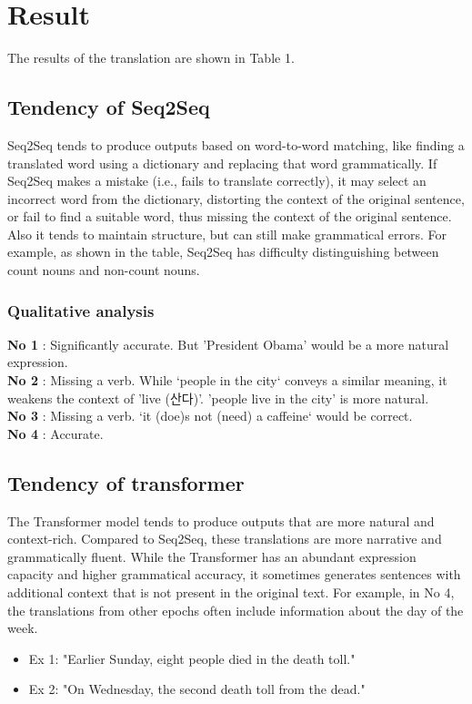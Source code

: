 \documentclass{article}
\begin{document}
\section{Result}
The results of the translation are shown in Table 1. 
\subsection{Tendency of Seq2Seq}
Seq2Seq tends to produce outputs based on word-to-word matching, like finding a translated word using a dictionary and replacing that word grammatically. If Seq2Seq makes a mistake (i.e., fails to translate correctly), it may select an incorrect word from the dictionary, distorting the context of the original sentence, or fail to find a suitable word, thus missing the context of the original sentence. Also it tends to maintain structure, but can still make grammatical errors. For example, as shown in the table, Seq2Seq has difficulty distinguishing between count nouns and non-count nouns.

\subsubsection{Qualitative analysis}
\textbf{No 1} : Significantly accurate. But 'President Obama' would be a more natural expression.\\
\textbf{No 2} : Missing a verb. While `people in the city` conveys a similar meaning, it weakens the context of 'live (산다)'. 'people live in the city' is more natural. \\
\textbf{No 3} : Missing a verb. `it (doe)s not (need) a caffeine` would be correct. \\
\textbf{No 4} : Accurate.

\subsection{Tendency of transformer}
The Transformer model tends to produce outputs that are more natural and context-rich. Compared to Seq2Seq, these translations are more narrative and grammatically fluent. While the Transformer has an abundant expression capacity and higher grammatical accuracy, it sometimes generates sentences with additional context that is not present in the original text. For example, in No 4, the translations from other epochs often include information about the day of the week. 
\begin{itemize}
  \item Ex 1: "Earlier Sunday, eight people died in the death toll."
  \item Ex 2: "On Wednesday, the second death toll from the dead."
\end{itemize}
\end{document}
